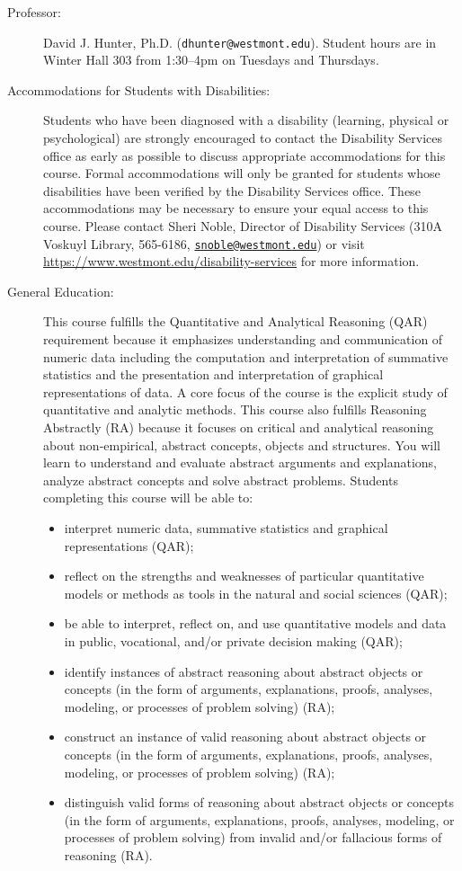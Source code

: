 \documentclass[
  twoside]{article}
\begin{document}
\begin{description} 

\item[Professor:] David J. Hunter, Ph.D.
  (\verb!dhunter@westmont.edu!). Student hours are in Winter Hall 303 
  from 1:30--4pm on Tuesdays and Thursdays.

\item[Accommodations for Students with Disabilities:] Students who have been diagnosed with a disability (learning, physical or psychological) are strongly encouraged to contact the Disability Services office as early as possible to discuss appropriate accommodations for this course. Formal accommodations will only be granted for students whose disabilities have been verified by the Disability Services office.  These accommodations may be necessary to ensure your equal access to this course.  Please contact Sheri Noble, Director of Disability Services (310A Voskuyl Library, 565-6186, \href{mailto:snoble@westmont.edu}{\tt snoble@westmont.edu}) or visit \url{https://www.westmont.edu/disability-services} for more information.

\item[General Education: ]
This course fulfills the Quantitative and Analytical Reasoning (QAR) requirement because it emphasizes understanding and communication of numeric data including the computation and interpretation of summative statistics and the presentation and interpretation of graphical representations of data. A core focus of the course is the explicit study of quantitative and analytic methods. This course also fulfills Reasoning Abstractly (RA) because it focuses on critical and analytical reasoning about non-empirical, abstract concepts, objects and structures. You will learn to understand and evaluate abstract arguments and explanations, analyze abstract concepts and solve abstract problems.  Students completing this course will be able to:
\begin{itemize}[noitemsep]
    \item interpret numeric data, summative statistics and graphical representations (QAR);
    \item reflect on the strengths and weaknesses of particular quantitative models or methods as tools in the natural and social sciences (QAR);
    \item be able to interpret, reflect on, and use quantitative models and data in public, vocational, and/or private decision making (QAR);
    \item identify instances of abstract reasoning about abstract objects or concepts (in the form of arguments, explanations, proofs, analyses, modeling, or processes of problem solving) (RA);
    \item construct an instance of valid reasoning about abstract objects or concepts (in the form of arguments, explanations, proofs, analyses, modeling, or processes of problem solving) (RA);
    \item distinguish valid forms of reasoning about abstract objects or concepts (in the form of arguments, explanations, proofs, analyses, modeling, or processes of problem solving) from invalid and/or fallacious
forms of reasoning (RA).
\end{itemize}


\end{description}
\end{document}
